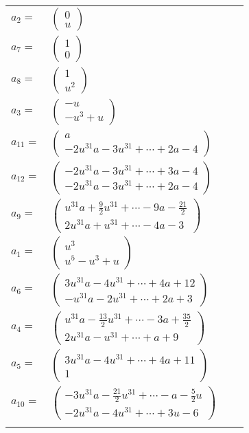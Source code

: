 \documentclass[1p]{elsarticle_modified}
\theoremstyle{definition}
\begin{document}
\begin{tabular}{m{7pt} m{180pt} m{7pt} m{180pt} }
\flushright $a_{2}=$&$\begin{pmatrix}0\\u\end{pmatrix}$ \\
\flushright $a_{7}=$&$\begin{pmatrix}1\\0\end{pmatrix}$ \\
\flushright $a_{8}=$&$\begin{pmatrix}1\\u^2\end{pmatrix}$ \\
\flushright $a_{3}=$&$\begin{pmatrix}- u\\- u^3+u\end{pmatrix}$ \\
\flushright $a_{11}=$&$\begin{pmatrix}a\\-2 u^{31} a-3 u^{31}+\cdots+2 a-4\end{pmatrix}$ \\
\flushright $a_{12}=$&$\begin{pmatrix}-2 u^{31} a-3 u^{31}+\cdots+3 a-4\\-2 u^{31} a-3 u^{31}+\cdots+2 a-4\end{pmatrix}$ \\
\flushright $a_{9}=$&$\begin{pmatrix}u^{31} a+\frac{9}{2} u^{31}+\cdots-9 a-\frac{21}{2}\\2 u^{31} a+u^{31}+\cdots-4 a-3\end{pmatrix}$ \\
\flushright $a_{1}=$&$\begin{pmatrix}u^3\\u^5- u^3+u\end{pmatrix}$ \\
\flushright $a_{6}=$&$\begin{pmatrix}3 u^{31} a-4 u^{31}+\cdots+4 a+12\\- u^{31} a-2 u^{31}+\cdots+2 a+3\end{pmatrix}$ \\
\flushright $a_{4}=$&$\begin{pmatrix}u^{31} a-\frac{13}{2} u^{31}+\cdots-3 a+\frac{35}{2}\\2 u^{31} a- u^{31}+\cdots+a+9\end{pmatrix}$ \\
\flushright $a_{5}=$&$\begin{pmatrix}3 u^{31} a-4 u^{31}+\cdots+4 a+11\\1\end{pmatrix}$ \\
\flushright $a_{10}=$&$\begin{pmatrix}-3 u^{31} a-\frac{21}{2} u^{31}+\cdots- a-\frac{5}{2} u\\-2 u^{31} a-4 u^{31}+\cdots+3 u-6\end{pmatrix}$\\&\end{tabular}
\end{document}
